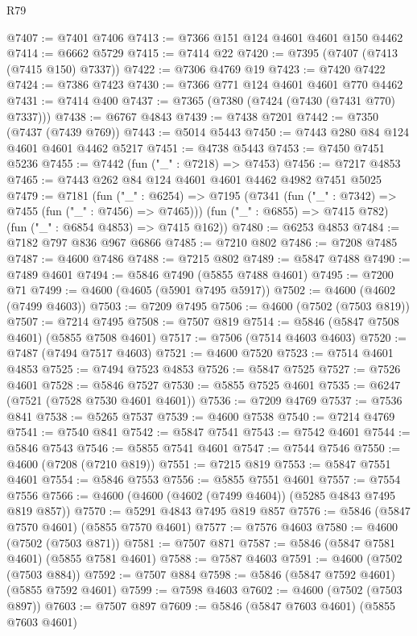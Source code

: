 \begin{lexlean}{R79}
\begin{coremodule}
@7407 := @7401 @7406
@7413 := @7366 @151 @124 @4601 @4601 @150 @4462
@7414 := @6662 @5729
@7415 := @7414 @22
@7420 := @7395 (@7407 (@7413 (@7415 @150) @7337))
@7422 := @7306 @4769 @19
@7423 := @7420 @7422
@7424 := @7386 @7423
@7430 := @7366 @771 @124 @4601 @4601 @770 @4462
@7431 := @7414 @400
@7437 := @7365 (@7380 (@7424 (@7430 (@7431 @770) @7337)))
@7438 := @6767 @4843
@7439 := @7438 @7201
@7442 := @7350 (@7437 (@7439 @769))
@7443 := @5014 @5443
@7450 := @7443 @280 @84 @124 @4601 @4601 @4462 @5217
@7451 := @4738 @5443
@7453 := @7450 @7451 @5236
@7455 := @7442 (fun ("_" : @7218) => @7453)
@7456 := @7217 @4853
@7465 := @7443 @262 @84 @124 @4601 @4601 @4462 @4982 @7451 @5025
@7479 := @7181
    (fun ("_" : @6254) =>
    @7195
      (@7341 (fun ("_" : @7342) => @7455 (fun ("_" : @7456) => @7465)))
      (fun ("_" : @6855) => @7415 @782)
      (fun ("_" : @6854 @4853) => @7415 @162))
@7480 := @6253 @4853
@7484 := @7182 @797 @836 @967 @6866
@7485 := @7210 @802
@7486 := @7208 @7485
@7487 := @4600 @7486
@7488 := @7215 @802
@7489 := @5847 @7488
@7490 := @7489 @4601
@7494 := @5846 @7490 (@5855 @7488 @4601)
@7495 := @7200 @71
@7499 := @4600 (@4605 (@5901 @7495 @5917))
@7502 := @4600 (@4602 (@7499 @4603))
@7503 := @7209 @7495
@7506 := @4600 (@7502 (@7503 @819))
@7507 := @7214 @7495
@7508 := @7507 @819
@7514 := @5846 (@5847 @7508 @4601) (@5855 @7508 @4601)
@7517 := @7506 (@7514 @4603 @4603)
@7520 := @7487 (@7494 @7517 @4603)
@7521 := @4600 @7520
@7523 := @7514 @4601 @4853
@7525 := @7494 @7523 @4853
@7526 := @5847 @7525
@7527 := @7526 @4601
@7528 := @5846 @7527
@7530 := @5855 @7525 @4601
@7535 := @6247 (@7521 (@7528 @7530 @4601 @4601))
@7536 := @7209 @4769
@7537 := @7536 @841
@7538 := @5265 @7537
@7539 := @4600 @7538
@7540 := @7214 @4769
@7541 := @7540 @841
@7542 := @5847 @7541
@7543 := @7542 @4601
@7544 := @5846 @7543
@7546 := @5855 @7541 @4601
@7547 := @7544 @7546
@7550 := @4600 (@7208 (@7210 @819))
@7551 := @7215 @819
@7553 := @5847 @7551 @4601
@7554 := @5846 @7553
@7556 := @5855 @7551 @4601
@7557 := @7554 @7556
@7566 := @4600 (@4600 (@4602 (@7499 @4604)) (@5285 @4843 @7495 @819 @857))
@7570 := @5291 @4843 @7495 @819 @857
@7576 := @5846 (@5847 @7570 @4601) (@5855 @7570 @4601)
@7577 := @7576 @4603
@7580 := @4600 (@7502 (@7503 @871))
@7581 := @7507 @871
@7587 := @5846 (@5847 @7581 @4601) (@5855 @7581 @4601)
@7588 := @7587 @4603
@7591 := @4600 (@7502 (@7503 @884))
@7592 := @7507 @884
@7598 := @5846 (@5847 @7592 @4601) (@5855 @7592 @4601)
@7599 := @7598 @4603
@7602 := @4600 (@7502 (@7503 @897))
@7603 := @7507 @897
@7609 := @5846 (@5847 @7603 @4601) (@5855 @7603 @4601)

\end{coremodule}
\end{lexlean}
